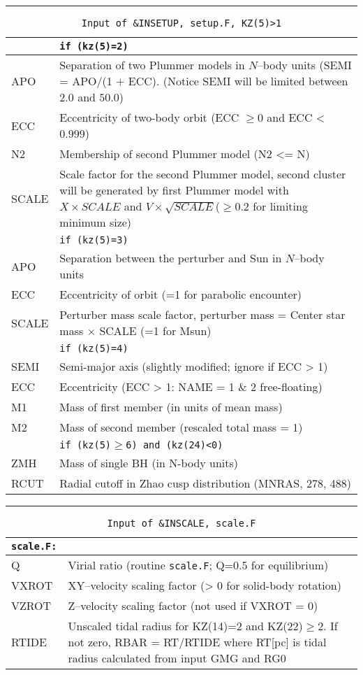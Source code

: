 \hrule
\noindent
\begin{longtable}{@{}p{1.5cm}p{13.0cm}}
\caption{\texttt{Input of \&INSETUP, setup.F, KZ(5)>1}}
\label{table:insetup}\\\hline
       & \texttt{if (kz(5)=2)} \\\hline
APO    & Separation of two Plummer models in $N$--body units (SEMI = APO/(1 $+$ ECC). (Notice SEMI will be limited between $2.0$ and $50.0$) \\
ECC    & Eccentricity of two-body orbit (ECC $\ge$0 and ECC < $0.999$) \\
N2     & Membership of second Plummer model (N2 <= N) \\
SCALE  & Scale factor for the second Plummer model, second cluster will be generated by first Plummer model with $X \times SCALE$ and $V \times \sqrt{SCALE}$($\ge 0.2$ for limiting minimum size) \\\hline
       & \texttt{if (kz(5)=3)} \\\hline
APO    & Separation between the perturber and Sun in $N$--body units \\
ECC    & Eccentricity of orbit (=1 for parabolic encounter) \\
SCALE  & Perturber mass scale factor, perturber mass = Center star mass $\times$ SCALE (=1 for Msun) \\\hline
       & \texttt{if (kz(5)=4)} \\\hline
SEMI   & Semi-major axis (slightly modified; ignore if ECC > 1) \\
ECC    & Eccentricity (ECC > 1: NAME = 1 \& 2 free-floating) \\
M1     & Mass of first member (in units of mean mass) \\
M2     & Mass of second member (rescaled total mass = 1) \\\hline
       & \texttt{if (kz(5)$\ge$6) and (kz(24)<0)} \\\hline
ZMH    & Mass of single BH (in N-body units) \\
RCUT   & Radial cutoff in Zhao cusp distribution (MNRAS, 278, 488) \\
\end{longtable}

\hrule
\noindent
\begin{longtable}{@{}p{1.5cm}p{13.0cm}}
\caption{\texttt{Input of \&INSCALE, scale.F}}
\label{table:inscale}\\\hline
\texttt{scale.F:} & \\\hline
%
Q       & Virial ratio (routine \texttt{scale.F}; Q=0.5 for equilibrium) \\
VXROT   & XY--velocity scaling factor (> 0 for solid-body rotation) \\
VZROT   & Z--velocity scaling factor (not used if VXROT = 0) \\
RTIDE   & Unscaled tidal radius for KZ(14)=2 and KZ(22)$\ge$2. If not zero, RBAR = RT/RTIDE where RT[pc] is tidal radius calculated from input GMG and RG0\\
\end{longtable}

